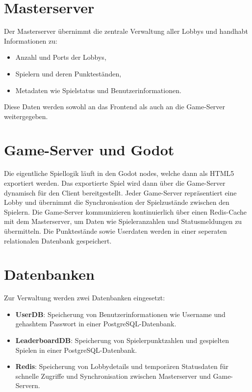 \section{Masterserver}
Der Masterserver übernimmt die zentrale Verwaltung aller Lobbys und handhabt Informationen zu:
\begin{itemize}
  \item Anzahl und Ports der Lobbys,
  \item Spielern und deren Punkteständen,
  \item Metadaten wie Spielstatus und Benutzerinformationen.
\end{itemize}
Diese Daten werden sowohl an das Frontend als auch an die Game-Server weitergegeben.

\section{Game-Server und Godot}
Die eigentliche Spiellogik läuft in den Godot nodes, welche dann als HTML5 exportiert werden.
Das exportierte Spiel wird dann über die Game-Server dynamisch für den Client bereitgestellt. 
Jeder Game-Server repräsentiert eine Lobby und übernimmt die Synchronisation der Spielzustände zwischen den Spielern. 
Die Game-Server kommunizieren kontinuierlich über einen Redis-Cache mit dem Masterserver, um Daten wie Spieleranzahlen und Statusmeldungen zu übermitteln.
Die Punktestände sowie Userdaten werden in einer seperaten relationalen Datenbank gespeichert.

\section{Datenbanken}
Zur Verwaltung werden zwei Datenbanken eingesetzt:
\begin{itemize}
  \item \textbf{UserDB}: Speicherung von Benutzerinformationen wie Username und gehashtem Passwort in einer PostgreSQL-Datenbank. 
  \item \textbf{LeaderboardDB}: Speicherung von Spielerpunktzahlen und gespielten Spielen in einer PostgreSQL-Datenbank.
  \item \textbf{Redis}: Speicherung von Lobbydetails und temporären Statusdaten für schnelle Zugriffe und Synchronisation zwischen Masterserver und Game-Servern.
\end{itemize}

